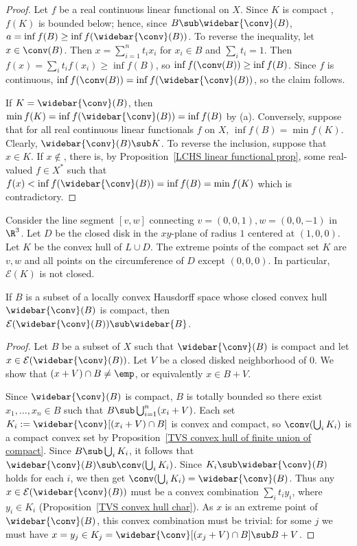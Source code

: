 \begin{proof}
Let $f$ be a real continuous linear functional on $X$. Since $K$ is compact , $f(K)$ is bounded below; hence, since $B\sub\widebar{\conv}(B)$, $a=\inf f(B)\geq\inf f(\widebar{\conv}(B))$. To reverse the inequality, let $x\in\conv(B)$. Then $x=\sum_{i=1}^{n}t_ix_i$ for $x_i\in B$ and $\sum_it_i=1$. Then $f(x)=\sum_it_if(x_i)\geq \inf f(B)$, so $\inf f(\conv(B))\geq\inf f(B)$. Since $f$ is continuous, $\inf f(\conv(B))=\inf f(\widebar{\conv}(B))$, so the claim follows.\par
If $K=\widebar{\conv}(B)$, then $\min f(K)=\inf f(\widebar{\conv}(B))=\inf f(B)$ by (a). Conversely, suppose that for all real continuous linear functionals $f$ on $X$, $\inf f(B)=\min f(K)$. Clearly, $\widebar{\conv}(B)\sub K$. To reverse the inclusion, suppose that $x\in K$. If $x\notin $, there is, by Proposition~\ref{LCHS linear functional prop}, some real-valued $f\in X^*$ such that $f(x)<\inf f(\widebar{\conv}(B))=\inf f(B)=\min f(K)$ which is contradictory.
\end{proof}
\begin{example}
Consider the line segment $[v,w]$ connecting $v=(0, 0,1),w=(0,0,-1)$ in $\R^3$. Let $D$ be the closed disk in the $xy$-plane of radius $1$ centered at $(1,0,0)$. Let $K$ be the convex hull of $L\cup D$. The extreme points of the compact set $K$ are $v,w$ and all points on the circumference of $D$ except $(0,0,0)$. In particular, $\mathcal{E}(K)$ is not closed.
\end{example}
\begin{lemma}\label{LCHS extreme point of closed convex hull}
If $B$ is a subset of a locally convex Hausdorff space whose closed convex hull $\widebar{\conv}(B)$ is compact, then $\mathcal{E}(\widebar{\conv}(B))\sub\widebar{B}$.
\end{lemma}
\begin{proof}
Let $B$ be a subset of $X$ such that $\widebar{\conv}(B)$ is compact and let $x\in\mathcal{E}(\widebar{\conv}(B))$. Let $V$ be a closed disked neighborhood of $0$. We show that $(x+V)\cap B\neq\emp$, or equivalently $x\in B+V$.\par
Since $\widebar{\conv}(B)$ is compact, $B$ is totally bounded so there exist $x_1,\dots,x_n\in B$ such that $B\sub\bigcup_{i=1}^{n}(x_i+V)$. Each set $K_i:=\widebar{\conv}[(x_i+V)\cap B]$ is convex and compact, so $\conv(\bigcup_iK_i)$ is a compact convex set by Proposition~\ref{TVS convex hull of finite union of compact}. Since $B\sub\bigcup_iK_i$, it follows that $\widebar{\conv}(B)\sub\conv(\bigcup_iK_i)$. Since $K_i\sub\widebar{\conv}(B)$ holds for each $i$, we then get $\conv(\bigcup_iK_i)=\widebar{\conv}(B)$. Thus any $x\in\mathcal{E}(\widebar{\conv}(B))$ must be a convex combination $\sum_it_iy_i$, where $y_i\in K_i$ (Proposition~\ref{TVS convex hull char}). As $x$ is an extreme point of $\widebar{\conv}(B)$, this convex combination must be trivial: for some $j$ we must have $x=y_j\in K_j=\widebar{\conv}[(x_j+V)\cap B]\sub B+V$.
\end{proof}
